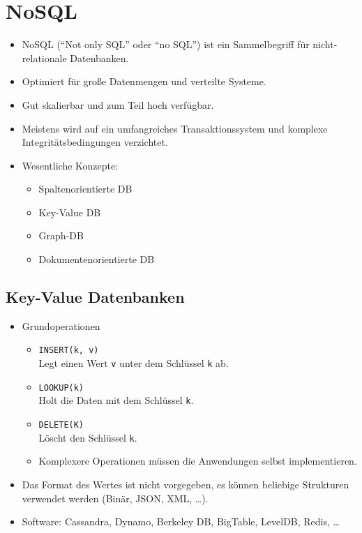 	\section{NoSQL} %
		\begin{itemize}
			\item NoSQL (\enquote{Not only SQL} oder \enquote{no SQL}) ist ein Sammelbegriff für nicht-relationale Datenbanken.
			\item Optimiert für große Datenmengen und verteilte Systeme.
			\item Gut skalierbar und zum Teil hoch verfügbar.
			\item Meistens wird auf ein umfangreiches Transaktionssystem und komplexe Integritätsbedingungen verzichtet.
			\item Wesentliche Konzepte:
				\begin{itemize}
					\item Spaltenorientierte DB
					\item Key-Value DB
					\item Graph-DB
					\item Dokumentenorientierte DB
				\end{itemize}
		\end{itemize}

		\subsection{Key-Value Datenbanken} %
			\begin{itemize}
				\item Grundoperationen
					\begin{itemize}
						\item \texttt{INSERT(k, v)} \\ Legt einen Wert \texttt{v} unter dem Schlüssel \texttt{k} ab.
						\item \texttt{LOOKUP(k)} \\ Holt die Daten mit dem Schlüssel \texttt{k}.
						\item \texttt{DELETE(K)} \\ Löscht den Schlüssel \texttt{k}.
						\item Komplexere Operationen müssen die Anwendungen selbst implementieren.
					\end{itemize}
				\item Das Format des Wertes ist nicht vorgegeben, es können beliebige Strukturen verwendet werden (Binär, JSON, XML, \dots).
				\item Software: Cassandra, Dynamo, Berkeley DB, BigTable, LevelDB, Redis, \dots
			\end{itemize}

